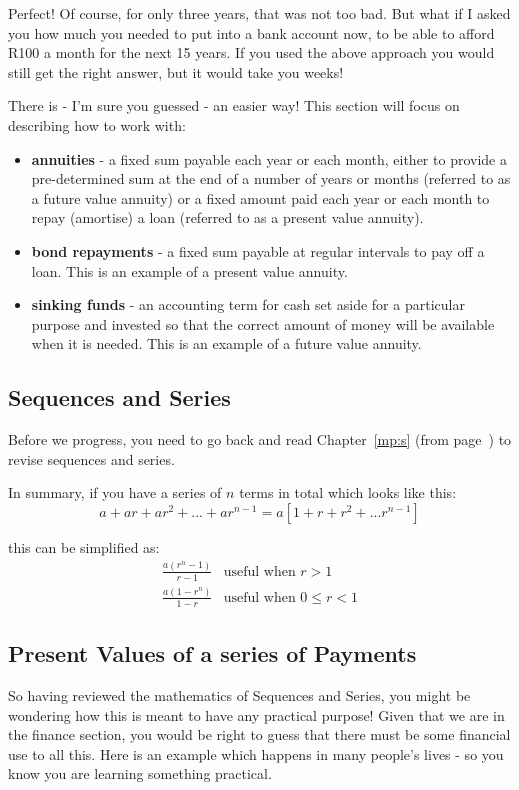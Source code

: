 Perfect! Of course, for only three years, that was not too bad. But what if I asked you how much you needed to put into a bank account now, to be able to afford R100 a month for the next 15 years. If you used the above approach you would still get the right answer, but it would take you weeks!

There is - I'm sure you guessed - an easier way! This section will focus on describing how to work with:
\begin{itemize}
\item{\textbf{annuities} - a fixed sum payable each year or each month, either to provide a pre-determined sum at the end of a number of years or months (referred to as a future value annuity) or a fixed amount paid each year or each month to repay (amortise) a loan (referred to as a present value annuity).}
\item{\textbf{bond repayments} - a fixed sum payable at regular intervals to pay off a loan. This is an example of a present value annuity.}
\item{\textbf{sinking funds} - an accounting term for cash set aside for a particular purpose and invested so that the correct amount of money will be available when it is needed. This is an example of a future value annuity.}
\end{itemize}

\subsection{Sequences and Series}
\label{m:f:ss}
Before we progress, you need to go back and read Chapter~\ref{mp:s} (from page~\pageref{mp:s}) to revise sequences and series.

In summary, if you have a series of $n$ terms in total which looks like this:
\begin{equation*}
a + ar + ar^2 + ... + ar^{n-1} = a [ 1 + r + r^2 + ... r^{n-1} ]
\end{equation*}

this can be simplified as:
\begin{eqnarray*}
\frac{a (r^n - 1)}{r-1} &\mbox{useful when $r>1$}\\
\frac{a (1 - r^n)}{1-r} &\mbox{useful when $0\le r <1$}
\end{eqnarray*}

\subsection{Present Values of a series of Payments}\label{presentvalues}
So having reviewed the mathematics of Sequences and Series, you might be wondering how this is meant to have any practical purpose! Given that we are in the finance section, you would be right to guess that there must be some financial use to all this. Here is an example which happens in many people's lives - so you know you are learning something practical.


